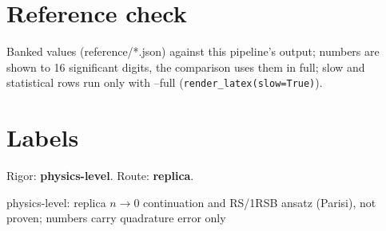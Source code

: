 \documentclass[11pt]{article}
\begin{document}
\section{Reference check}
Banked values (reference/*.json) against this pipeline's output; numbers are shown to 16 significant digits, the comparison uses them in full; slow and statistical rows run only with --full (\texttt{render\_latex(slow=True)}).
\begin{center}\footnotesize
\setlength{\tabcolsep}{4pt}
\end{center}
\section{Labels}
Rigor: \textbf{physics-level}. Route: \textbf{replica}.

physics-level: replica $n \to 0$ continuation and RS/1RSB ansatz (Parisi), not proven; numbers carry quadrature error only
\end{document}
